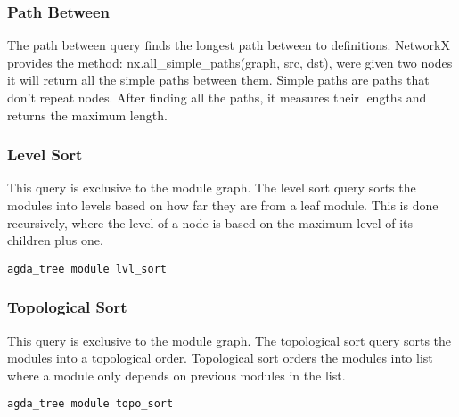 \subsubsection{Path Between}

The path between query finds the longest path between to definitions. NetworkX
provides the method: \textsf{nx.all\_simple\_paths(graph, src, dst)}, were given
two nodes it will return all the simple paths between them. Simple paths are
paths that don't repeat nodes. After finding all the paths, it measures their
lengths and returns the maximum length.


\subsubsection{Level Sort}

This query is exclusive to the module graph. The level sort query sorts the
modules into levels based on how far they are from a leaf module. This is done
recursively, where the level of a node is based on the maximum level of its
children plus one.

\begin{lstlisting}
agda_tree module lvl_sort
\end{lstlisting}

\subsubsection{Topological Sort}

This query is exclusive to the module graph. The topological sort query sorts
the modules into a topological order. Topological sort orders the modules into
list where a module only depends on previous modules in the list.


\begin{lstlisting}
agda_tree module topo_sort
\end{lstlisting}


